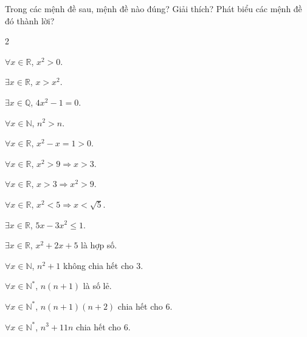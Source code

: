 \begin{bt}%
	Trong các mệnh đề sau, mệnh đề nào đúng? Giải  thích? Phát biểu các mệnh đề đó thành lời?
	\begin{enumEX}{2}
		\item $\forall x\in \mathbb{R}$, $x^2>0$. 
		 \item $\exists x\in \mathbb{R}$, $x>x^2$.
		\item $\exists  x\in \mathbb{Q}$, $4x^2-1=0$.
		\item $\forall x\in  \mathbb{N}$, $n^2>n$.
		\item $\forall x\in \mathbb{R}$,  $x^2-x=1>0$.
		\item $\forall x\in \mathbb{R}$,  $x^2>9\Rightarrow x>3$.
		\item $\forall  x\in \mathbb{R}$, $x>3\Rightarrow x^2>9$.
		\item $\forall x\in \mathbb{R}$, $x^2<5\Rightarrow x<\sqrt{5}$. 
		\item $\exists x\in  \mathbb{R}$, $5x-3x^2\le 1$.
		\item $\exists x\in \mathbb{R}$, $x^2+2x+5$ là  hợp số.
		\item $\forall x\in \mathbb{N}$, $n^2+1$ không chia hết cho  $3$.
		 \item $\forall x\in \mathbb{N^*}$, $n(n+1)$ là số lẻ.
		\item $\forall  x\in \mathbb{N^*}$, $n(n+1)(n+2)$ chia hết cho $6$.
		 \item $\forall x\in \mathbb{N^*}$, $n^3+11n$ chia hết cho $6$.
	\end{enumEX}
\end{bt}
